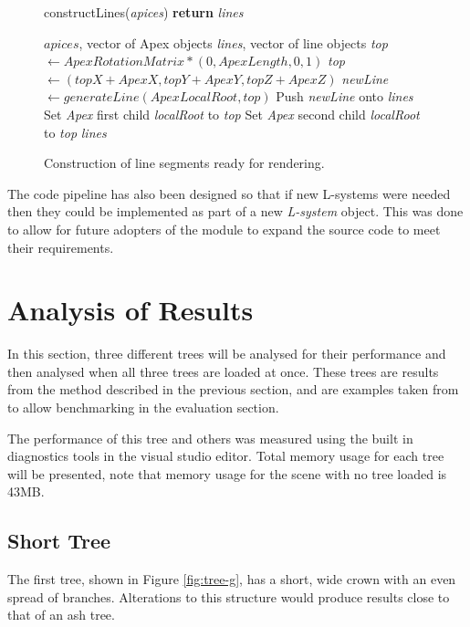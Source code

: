 \documentclass[final]{cmpreport}
\begin{document}
\begin{figure}[ht]
    \begin{algorithm}[H]
    \caption{constructLines(\emph{apices}) {\textbf{return}} \emph{lines}}
        \begin{algorithmic}[1]
        \Require $apices$, vector of Apex objects
        \Ensure \emph{lines}, vector of line objects
            \State \emph{top} $\leftarrow ApexRotationMatrix * (0, ApexLength, 0, 1)$ 
            \State \emph{top} $\leftarrow (topX + ApexX, topY + ApexY, topZ + ApexZ)$ 
            \State \emph{newLine} $\leftarrow generateLine(ApexLocalRoot, top)$ 
            \State Push \emph{newLine} onto \emph{lines}
                \State Set \emph{Apex} first child \emph{localRoot} to \emph{top}
            \EndIf
                \State Set \emph{Apex} second child \emph{localRoot} to \emph{top}
            \EndIf
        \EndFor
        \State \Return \emph{lines}
        \end{algorithmic}
    \end{algorithm}
    \caption{Construction of line segments ready for rendering.}
    \label{fig:construct-lines}
\end{figure}

The code pipeline has also been designed so that if new L-systems were needed then they could 
be implemented as part of a new \emph{L-system} object. This was done to allow for future 
adopters of the module to expand the source code to meet their requirements.

\section{Analysis of Results}
In this section, three different trees will be analysed for their performance and then analysed 
when all three trees are loaded at once. These trees are results from the method described in 
the previous section, and are examples taken from \cite{prusinkiewicz1996systems} to allow 
benchmarking in the evaluation section.

The performance of this tree and others was measured using the built in diagnostics tools in 
the visual studio editor. Total memory usage for each tree will be presented, note that memory 
usage for the scene with no tree loaded is 43MB.

\subsection{Short Tree}
The first tree, shown in Figure \ref{fig:tree-g}, has a short, wide crown with an even spread of branches.
Alterations to this structure would produce results close to that of an ash tree. 
\end{document}
